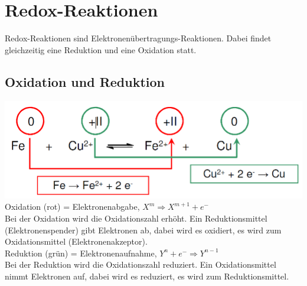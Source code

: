 \section{Redox-Reaktionen}
Redox-Reaktionen sind Elektronenübertragungs-Reaktionen. Dabei findet gleichzeitig eine Reduktion und eine Oxidation statt.

\subsection{Oxidation und Reduktion}
\includegraphics[width=0.6\linewidth]{images/9_Redox_Reaktion.png}\\
Oxidation (rot) = Elektronenabgabe, $X^m \Rightarrow X^{m+1} + e{^-}$\\
Bei der Oxidation wird die Oxidationszahl erhöht. Ein Reduktionsmittel (Elektronenspender) gibt Elektronen ab, dabei wird es oxidiert, es wird zum Oxidationsmittel (Elektronenakzeptor).\\
Reduktion (grün) = Elektronenaufnahme, $Y^n + e{^-} \Rightarrow Y^{n-1}$\\
Bei der Reduktion wird die Oxidationszahl reduziert. Ein Oxidationsmittel nimmt Elektronen auf, dabei wird es reduziert, es wird zum Reduktionsmittel.

